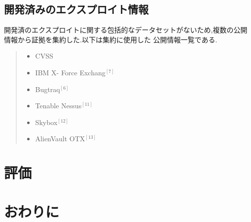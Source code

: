 \documentclass[submit,techreq,noauthor]{eco}	%
\begin{document}
\subsection*{開発済みのエクスプロイト情報}
開発済のエクスプロイトに関する包括的なデータセットがないため,複数の公開情報から証拠を集約した.以下は集約に使用した
公開情報一覧である.
\begin{quote}
  \begin{itemize}
   \item CVSS
   \item IBM X- Force Exchang\begin{math}^{[7]}\end{math}
   \item Bugtraq\begin{math}^{[6]}\end{math}
   \item Tenable Nessus\begin{math}^{[11]}\end{math}
   \item Skybox\begin{math}^{[12]}\end{math}
   \item AlienVault OTX\begin{math}^{[13]}\end{math}
  \end{itemize}
\end{quote}

\section{評価}


\section{おわりに}
\end{document}
